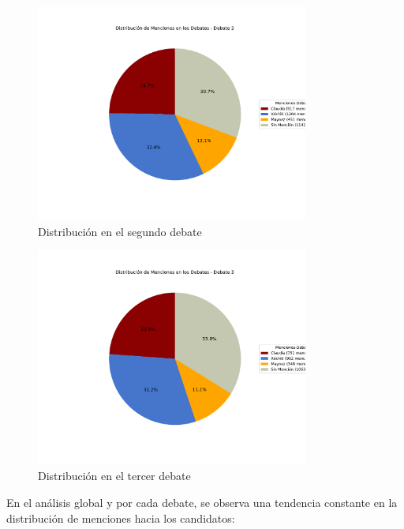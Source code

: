 \documentclass[10pt, a4paper]{article}
\begin{document}
	\begin{figure}[h!]
		\centering
		\includegraphics[width=0.8\textwidth]{grafica_debate2.pdf} %
		\vspace{-15mm}
		\caption{Distribución en el segundo debate}
		\label{fig:distrDebate2} %
	\end{figure}
	
	\begin{figure}[h!]
		\centering
		\includegraphics[width=0.8\textwidth]{grafica_debate3.pdf} %
		\vspace{-15mm}
		\caption{Distribución en el tercer debate}
		\label{fig:distrDebate3} %
	\end{figure}
	
	En el análisis global y por cada debate, se observa una tendencia constante en la distribución de menciones hacia los candidatos:
	
\end{document}
